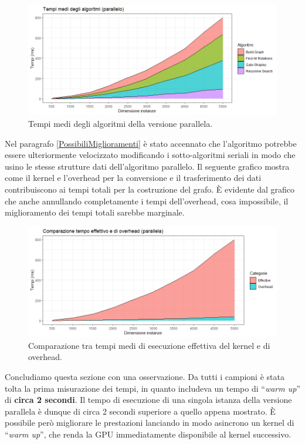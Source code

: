 \documentclass[12pt]{article}
\newcommand{\quotes}[1]{``\textit{#1}''}
\begin{document}
    \begin{figure}[h]
        \includegraphics[scale=0.7]{mean_times_parallel.png}
        \caption{Tempi medi degli algoritmi della versione parallela.}
        \label{fig:tempimediparallela}
    \end{figure}

    \FloatBarrier

    Nel paragrafo \ref{PossibiliMiglioramenti} è stato accennato che l'algoritmo potrebbe essere ulteriormente velocizzato modificando i sotto-algoritmi seriali in modo che usino le stesse strutture dati dell'algoritmo parallelo. Il seguente grafico mostra come il kernel e l'overhead per la conversione e il trasferimento dei dati contribuiscono ai tempi totali per la costruzione del grafo. È evidente dal grafico che anche annullando completamente i tempi dell'overhead, cosa impossibile, il miglioramento dei tempi totali sarebbe marginale.

    \begin{figure}[h]
        \includegraphics[scale=0.7]{immagini/mean_times_effective_overhead.png}
        \caption{Comparazione tra tempi medi di esecuzione effettiva del kernel e di overhead.}
        \label{fig:tempikerneleffetticooverhead}
    \end{figure}

    \FloatBarrier

    Concludiamo questa sezione con una osservazione. Da tutti i campioni è stata tolta la prima misurazione dei tempi, in quanto includeva un tempo di \quotes{warm up} di \textbf{circa 2 secondi}. Il tempo di esecuzione di una singola istanza della versione parallela è dunque di circa 2 secondi superiore a quello appena mostrato. È possibile però migliorare le prestazioni lanciando in modo asincrono un kernel di \quotes{warm up}, che renda la GPU immediatamente disponibile al kernel successivo.
    
\end{document}
